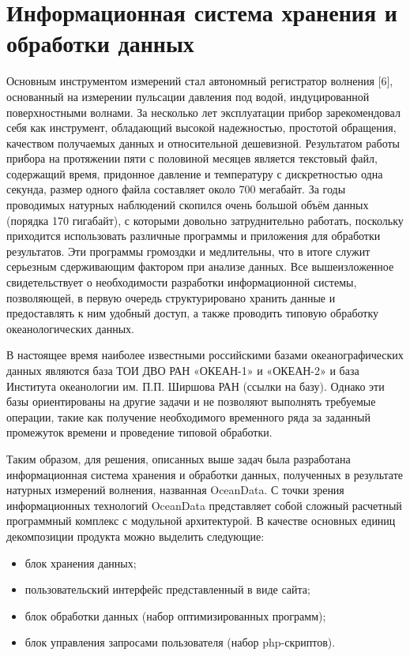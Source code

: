 \section{Информационная система хранения и обработки данных}\label{informSystem}

Основным инструментом измерений стал автономный регистратор волнения \textcolor[rgb]{1.00,0.00,0.00}{[6]}, основанный на измерении пульсации давления под водой, индуцированной поверхностными волнами. За несколько лет эксплуатации прибор зарекомендовал себя как инструмент, обладающий высокой надежностью, простотой обращения, качеством получаемых данных и относительной дешевизной. Результатом работы прибора на протяжении пяти с половиной месяцев является текстовый файл, содержащий время, придонное давление и температуру с дискретностью одна секунда, размер одного файла составляет около 700 мегабайт. За годы проводимых натурных наблюдений скопился очень большой объём данных (порядка 170 гигабайт), с которыми довольно затруднительно работать, поскольку приходится использовать различные программы и приложения для обработки результатов. Эти программы громоздки и медлительны, что в итоге служит серьезным сдерживающим фактором при анализе данных. Все вышеизложенное свидетельствует о необходимости разработки информационной системы, позволяющей, в первую очередь структурировано хранить данные и предоставлять к ним удобный доступ, а также проводить типовую обработку океанологических данных.

В настоящее время наиболее известными российскими базами океанографических данных являются база ТОИ ДВО РАН «ОКЕАН-1» и «ОКЕАН-2»  и база Института океанологии им. П.П. Ширшова РАН \textcolor[rgb]{1.00,0.00,0.00}{(ссылки на базу)}. Однако эти базы ориентированы на другие задачи и не позволяют выполнять требуемые операции, такие как получение необходимого временного ряда за заданный промежуток времени и проведение типовой обработки.

Таким образом, для решения, описанных выше задач была разработана информационная система хранения и обработки данных, полученных в результате натурных измерений волнения, названная OceanData. С точки зрения информационных технологий OceanData представляет собой сложный расчетный программный комплекс с модульной архитектурой. В качестве основных единиц декомпозиции продукта можно выделить следующие:
\begin{itemize}
  \item блок хранения данных;
  \item пользовательский интерфейс представленный в виде сайта;
  \item блок обработки данных (набор оптимизированных программ);
  \item блок управления запросами пользователя (набор php-скриптов).
\end{itemize}

